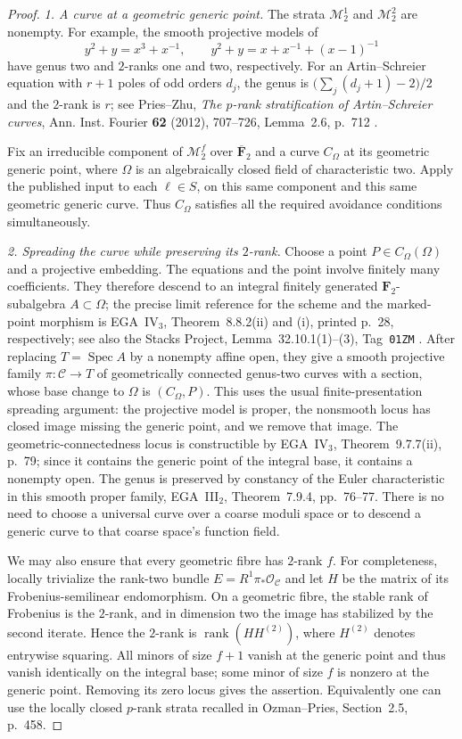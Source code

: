 \begin{proof}
\emph{1. A curve at a geometric generic point.}
The strata $\mathcal M_2^1$ and $\mathcal M_2^2$ are nonempty.  For
example, the smooth projective models of
\[
 y^2+y=x^3+x^{-1},\qquad
 y^2+y=x+x^{-1}+(x-1)^{-1}
\]
have genus two and $2$-ranks one and two, respectively.  For an
Artin--Schreier equation with $r+1$ poles of odd orders $d_j$, the
genus is $\bigl(\sum_j(d_j+1)-2\bigr)/2$ and the $2$-rank is $r$;
see Pries--Zhu, \emph{The $p$-rank stratification of Artin--Schreier
curves}, Ann. Inst. Fourier \textbf{62} (2012), 707--726,
Lemma~2.6, p.~712 \cite{PriesZhu2012}.

Fix an irreducible component of $\mathcal M_2^f$ over
$\overline{\mathbf F}_2$ and a curve $C_\Omega$ at its geometric generic
point, where $\Omega$ is an algebraically closed field of characteristic
two.  Apply the published input to each $\ell\in S$, on this same
component and this same geometric generic curve.  Thus $C_\Omega$
satisfies all the required avoidance conditions simultaneously.

\emph{2. Spreading the curve while preserving its $2$-rank.}
Choose a point $P\in C_\Omega(\Omega)$ and a projective embedding.
The equations and the point involve finitely many coefficients.
They therefore descend to an integral finitely generated
$\mathbf F_2$-subalgebra $A\subset\Omega$; the precise limit reference
for the scheme and the marked-point morphism is EGA~IV$_3$,
Theorem~8.8.2(ii) and (i), printed p.~28, respectively;
see also the Stacks Project, Lemma~32.10.1(1)--(3),
Tag~\texttt{01ZM} \cite{EGAIV3,Stacks}.
After replacing
$T=\operatorname{Spec}A$ by a nonempty affine open, they give a smooth
projective family $\pi:\mathcal C\to T$ of geometrically connected
genus-two curves with a section, whose base change to $\Omega$ is
$(C_\Omega,P)$.  This uses the usual finite-presentation spreading
argument: the projective model is proper, the nonsmooth locus has
closed image missing the generic point, and we remove that image.
The geometric-connectedness locus is constructible by EGA~IV$_3$,
Theorem~9.7.7(ii), p.~79; since it contains the generic point of
the integral base, it contains a nonempty open.  The genus is
preserved by constancy of the Euler characteristic in this smooth
proper family, EGA~III$_2$, Theorem~7.9.4, pp.~76--77.
There is no need to choose a universal curve over a coarse moduli
space or to descend a generic curve to that coarse space's function
field.

We may also ensure that every geometric fibre has $2$-rank $f$.
For completeness, locally trivialize the rank-two bundle
$E=R^1\pi_*\mathcal O_{\mathcal C}$ and let $H$ be the matrix of its
Frobenius-semilinear endomorphism.  On a geometric fibre, the stable
rank of Frobenius is the $2$-rank, and in dimension two the image has
stabilized by the second iterate.  Hence the $2$-rank is
$\operatorname{rank}(H H^{(2)})$, where $H^{(2)}$ denotes entrywise
squaring.  All minors of size $f+1$ vanish at the generic point and
thus vanish identically on the integral base; some minor of size $f$
is nonzero at the generic point.  Removing its zero locus gives the
assertion.  Equivalently one can use the locally closed $p$-rank
strata recalled in Ozman--Pries, Section~2.5, p.~458.


\end{proof}
